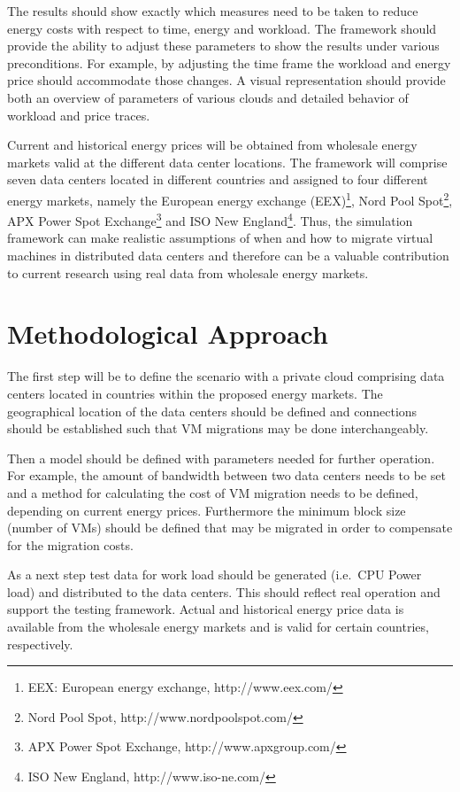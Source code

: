 \documentclass[a4paper]{article}
\begin{document}
The results should show exactly which measures need to be taken to reduce energy costs with respect to time, energy and workload. The framework should provide the ability to adjust these parameters to show the results under various preconditions. For example, by adjusting the time frame the workload and energy price should accommodate those changes. A visual representation should provide both an overview of parameters of various clouds and detailed behavior of workload and price traces. 

Current and historical energy prices will be obtained from wholesale energy markets valid at the different data center locations. The framework will comprise seven data centers located in different countries and assigned to four different energy markets, namely the 
European energy exchange (EEX)\footnote{EEX: European energy exchange, http://www.eex.com/}, Nord Pool Spot\footnote{Nord Pool Spot, http://www.nordpoolspot.com/}, APX Power Spot Exchange\footnote{APX Power Spot Exchange, http://www.apxgroup.com/} and ISO New England\footnote{ISO New England, http://www.iso-ne.com/}. Thus, the simulation framework can make realistic assumptions of when and how to migrate virtual machines in distributed data centers and therefore can be a valuable contribution to current research using real data from wholesale energy markets. 


\section{Methodological Approach}

The first step will be to define the scenario with a private cloud comprising data centers located in countries within the proposed energy markets. The geographical location of the data centers should be defined and connections should be established such that VM migrations may be done interchangeably. 

Then a model should be defined with parameters needed for further operation. For example, the amount of bandwidth between two data centers needs to be set and a method for calculating the cost of VM migration needs to be defined, depending on current energy prices. Furthermore the minimum block size (number of VMs) should be defined that may be migrated in order to compensate for the migration costs.

As a next step test data for work load should be generated (i.e.\ CPU Power load) and distributed to the data centers. This should reflect real operation and support the testing framework. Actual and historical energy price data is available from the wholesale energy markets and is valid for certain countries, respectively. 
\end{document}
